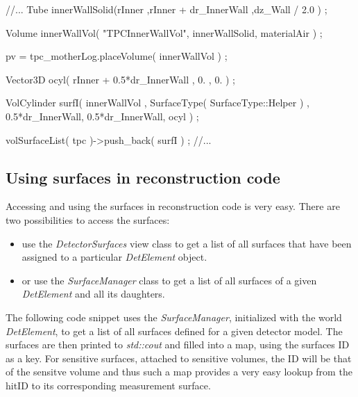 \documentclass[10pt,a4paper]{article}
\begin{document}
\begin{code}
  //...
  Tube innerWallSolid(rInner ,rInner + dr_InnerWall ,dz_Wall / 2.0 ) ;

  Volume innerWallVol( "TPCInnerWallVol", innerWallSolid, materialAir ) ; 

  pv = tpc_motherLog.placeVolume( innerWallVol ) ;

  Vector3D ocyl(  rInner + 0.5*dr_InnerWall , 0. , 0. ) ;

  VolCylinder surfI( innerWallVol , 
                     SurfaceType( SurfaceType::Helper ) ,
                     0.5*dr_InnerWall, 0.5*dr_InnerWall, 
                     ocyl ) ;

  volSurfaceList( tpc )->push_back(  surfI ) ;
  //...
\end{code}




\subsection{Using surfaces in reconstruction code}
\label{subsec:ddrec-surfaces-reconstruction}
Accessing and using the surfaces in reconstruction code is very easy. 
There are two possibilities to access the surfaces:
\begin{itemize}
\item use the {\em DetectorSurfaces} view class to get a list of 
 all surfaces that have been assigned to a particular {\em DetElement}
 object.
\item or use the {\em SurfaceManager} class to get a list of all
 surfaces of a given {\em DetElement} and all its daughters.
\end{itemize}

\noindent
The following code snippet uses the {\em SurfaceManager}, initialized
with the world  {\em DetElement}, to get a list of all surfaces 
defined for a given detector model.
The surfaces are then printed to {\em std::cout} and filled 
into a map, using the surfaces ID as a key.
For sensitive surfaces, attached to sensitive volumes, the ID
will be that of the sensitve volume and thus such a map provides
a very easy lookup from the hitID to its corresponding measurement
surface.
\end{document}
